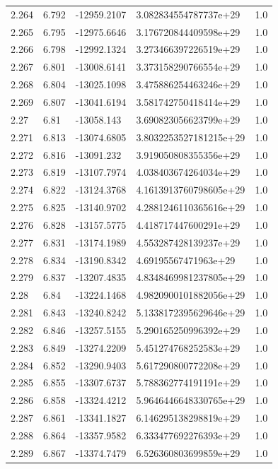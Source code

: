 \begin{tabular}{lllll}
2.264 & 6.792 & -12959.2107 & 3.082834554787737e+29 & 1.0 \\
2.265 & 6.795 & -12975.6646 & 3.176720844409598e+29 & 1.0 \\
2.266 & 6.798 & -12992.1324 & 3.273466397226519e+29 & 1.0 \\
2.267 & 6.801 & -13008.6141 & 3.373158290766554e+29 & 1.0 \\
2.268 & 6.804 & -13025.1098 & 3.475886254463246e+29 & 1.0 \\
2.269 & 6.807 & -13041.6194 & 3.581742750418414e+29 & 1.0 \\
2.27 & 6.81 & -13058.143 & 3.690823056623799e+29 & 1.0 \\
2.271 & 6.813 & -13074.6805 & 3.8032253527181215e+29 & 1.0 \\
2.272 & 6.816 & -13091.232 & 3.919050808355356e+29 & 1.0 \\
2.273 & 6.819 & -13107.7974 & 4.038403674264034e+29 & 1.0 \\
2.274 & 6.822 & -13124.3768 & 4.1613913760798605e+29 & 1.0 \\
2.275 & 6.825 & -13140.9702 & 4.2881246110365616e+29 & 1.0 \\
2.276 & 6.828 & -13157.5775 & 4.418717447600291e+29 & 1.0 \\
2.277 & 6.831 & -13174.1989 & 4.553287428139237e+29 & 1.0 \\
2.278 & 6.834 & -13190.8342 & 4.69195567471963e+29 & 1.0 \\
2.279 & 6.837 & -13207.4835 & 4.8348469981237805e+29 & 1.0 \\
2.28 & 6.84 & -13224.1468 & 4.9820900101882056e+29 & 1.0 \\
2.281 & 6.843 & -13240.8242 & 5.1338172395629646e+29 & 1.0 \\
2.282 & 6.846 & -13257.5155 & 5.290165250996392e+29 & 1.0 \\
2.283 & 6.849 & -13274.2209 & 5.451274768252583e+29 & 1.0 \\
2.284 & 6.852 & -13290.9403 & 5.617290800772208e+29 & 1.0 \\
2.285 & 6.855 & -13307.6737 & 5.788362774191191e+29 & 1.0 \\
2.286 & 6.858 & -13324.4212 & 5.9646446648330765e+29 & 1.0 \\
2.287 & 6.861 & -13341.1827 & 6.146295138298819e+29 & 1.0 \\
2.288 & 6.864 & -13357.9582 & 6.333477692276393e+29 & 1.0 \\
2.289 & 6.867 & -13374.7479 & 6.526360803699859e+29 & 1.0 \\

\end{tabular}

